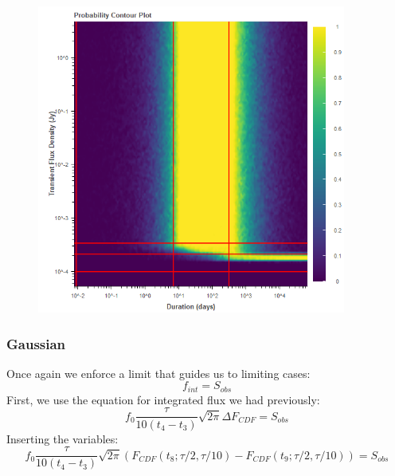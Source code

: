 \documentclass{article}
\begin{document}
\begin{figure}[H] 
	\begin{center}
		\includegraphics[width=4in]{output_tophat_ProbContour.png}
		
		\label{tophat}
	\end{center}
\end{figure}
\subsubsection{Gaussian}
Once again we enforce a limit that guides us to limiting cases:
\[f_{int} = S_{obs}\]
 First, we use the equation for integrated flux we had previously:
\[f_0 \frac{\tau}{10(t_4-t_3)}\sqrt{2\pi}\Delta F_{CDF} =  S_{obs}\]
Inserting the variables:
\[f_0 \frac{\tau}{10(t_4 - t_3)}\sqrt{2\pi}(F_{CDF}(t_8; \tau/2,\tau/10) -F_{CDF}(t_9; \tau/2, \tau/10)) =  S_{obs}\]
\end{document}
